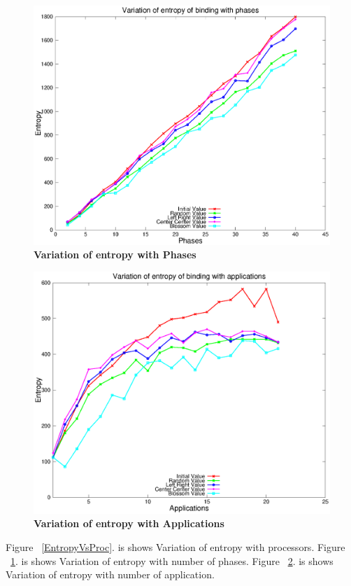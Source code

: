 \documentclass[10pt, conference]{IEEEtran}
\begin{document}
\begin{figure} [tb]
\centering
\includegraphics[scale=0.45]{figure/data2.eps}
\caption{\textbf{Variation of entropy with Phases}}
\label{EntropyVsPhases}
\end{figure}

\begin{figure} [tb]
\centering
\includegraphics[scale=0.45]{figure/data3.eps}
\caption{\textbf{Variation of entropy with Applications}}
\label{EntropyVsApps}
\end{figure}


Figure ~\ref{EntropyVsProc}. is shows Variation of entropy with processors. Figure ~\ref{EntropyVsPhases}. is shows Variation of entropy with number of phases. Figure ~\ref{EntropyVsApps}. is shows Variation of entropy with number of application.
\end{document}
